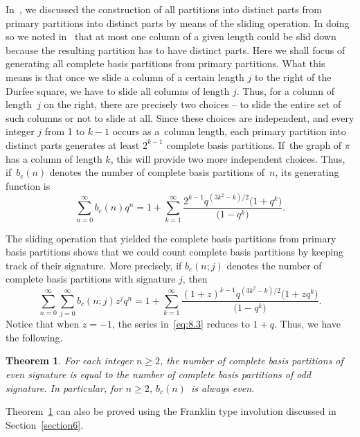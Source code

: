 \documentclass[pdftex]{sigma}
\numberwithin{equation}{section}
\newtheorem{Theorem}{Theorem}[section]
\theoremstyle{definition}
\begin{document}
In~\cite{Al0097}, we discussed the construction of all partitions into distinct parts
from primary partitions into distinct parts by means of the sliding operation.
In doing so we noted in~\cite{Al0097} that at most one column of a given length could be
slid down because the resulting partition has to have distinct parts.
Here we shall focus of generating all complete basis partitions from primary
partitions. What this means is that once we slide a column of a certain length
$j$ to the right of the Durfee square, we have to slide all columns of length
$j$. Thus, for a column of length~$j$ on the right, there are precisely two
choices -- to slide the entire set of such columns or not to slide at all. Since
these choices are independent, and every integer $j$ from 1 to $k-1$ occurs as
a~column length, each primary partition into distinct parts generates at least
$2^{k-1}$ complete basis partitions. If~the graph of $\pi$ has a column of
length $k$, this will provide two more independent choices. Thus, if~$b_c(n)$
denotes the number of complete basis partitions of~$n$, its generating
function is
\begin{equation}
\sum^{\infty}_{n=0}b_c(n)q^n=
1+\sum^{\infty}_{k=1}\frac{2^{k-1}q^{(3k^2-k)/2}\bigl(1+q^k\bigr)}{\bigl(1-q^k\bigr)}.\label{eq:8.2}
\end{equation}

The sliding operation that yielded the complete basis partitions from primary
basis partitions shows that we could count complete basis partitions
by keeping track of their signature. More precisely, if $b_c(n;j)$ denotes
the number of complete basis partitions with signature $j$, then
\begin{equation}
\sum^{\infty}_{n=0}\sum^{\infty}_{j=0}b_c(n;j)z^jq^n=
1+\sum^{\infty}_{k=1}\frac{(1+z)^{k-1}q^{(3k^2-k)/2}\bigl(1+zq^k\bigr)}{\bigl(1-q^k\bigr)}.\label{eq:8.3}
\end{equation}
Notice that when $z=-1$, the series in~\eqref{eq:8.3} reduces to $1+q$. Thus, we have the following.

\begin{Theorem}\label{thm:7}
For each integer $n\ge 2$, the number of
complete basis partitions of even signature is equal to the number of
complete basis partitions of odd signature. In particular, for $n\ge 2$, $b_c(n)$~is always even.
\end{Theorem}

Theorem~\ref{thm:7} can also be proved using the Franklin type involution discussed in
Section~\ref{section6}.
\end{document}
